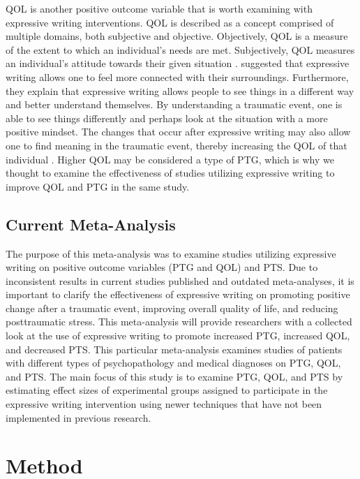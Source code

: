 \documentclass[english,man]{apa6}
\theoremstyle{definition}
\theoremstyle{definition}
\theoremstyle{definition}
\theoremstyle{remark}
\begin{document}
QOL is another positive outcome variable that is worth examining with
expressive writing interventions. QOL is described as a concept
comprised of multiple domains, both subjective and objective.
Objectively, QOL is a measure of the extent to which an individual's
needs are met. Subjectively, QOL measures an individual's attitude
towards their given situation \autocite{Costanza2007}.
\textcite{Pennebaker2001} suggested that expressive writing allows one
to feel more connected with their surroundings. Furthermore, they
explain that expressive writing allows people to see things in a
different way and better understand themselves. By understanding a
traumatic event, one is able to see things differently and perhaps look
at the situation with a more positive mindset. The changes that occur
after expressive writing may also allow one to find meaning in the
traumatic event, thereby increasing the QOL of that individual
\autocite{Frankl1959}. Higher QOL may be considered a type of PTG, which
is why we thought to examine the effectiveness of studies utilizing
expressive writing to improve QOL and PTG in the same study.

\subsection{Current Meta-Analysis}\label{current-meta-analysis}

The purpose of this meta-analysis was to examine studies utilizing
expressive writing on positive outcome variables (PTG and QOL) and PTS.
Due to inconsistent results in current studies published and outdated
meta-analyses, it is important to clarify the effectiveness of
expressive writing on promoting positive change after a traumatic event,
improving overall quality of life, and reducing posttraumatic stress.
This meta-analysis will provide researchers with a collected look at the
use of expressive writing to promote increased PTG, increased QOL, and
decreased PTS. This particular meta-analysis examines studies of
patients with different types of psychopathology and medical diagnoses
on PTG, QOL, and PTS. The main focus of this study is to examine PTG,
QOL, and PTS by estimating effect sizes of experimental groups assigned
to participate in the expressive writing intervention using newer
techniques that have not been implemented in previous research.

\section{Method}\label{method}
\end{document}
